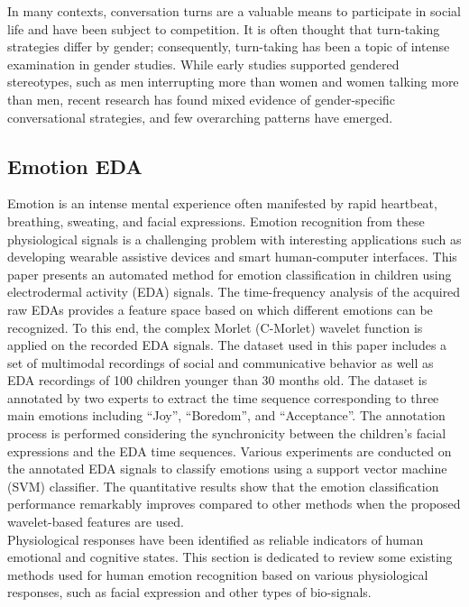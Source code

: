In many contexts, conversation turns are a valuable means to participate in social life 
and have been subject to competition.\cite{DOMER2011} It is often thought that turn-taking strategies 
differ by gender; consequently, turn-taking has been a topic of intense examination in 
gender studies. While early studies supported gendered stereotypes, such as men interrupting
more than women and women talking more than men,\cite{DefineSocial2005} recent research has found mixed evidence 
of gender-specific conversational strategies, and few overarching patterns have emerged.\cite{SocialInteract2003}\\



\subsection{Emotion EDA}
Emotion is an intense mental experience often manifested by rapid heartbeat, breathing, 
sweating, and facial expressions. Emotion recognition from these physiological signals 
is a challenging problem with interesting applications such as developing wearable 
assistive devices and smart human-computer interfaces. This paper presents an automated 
method for emotion classification in children using electrodermal activity (EDA) signals. 
The time-frequency analysis of the acquired raw EDAs provides a feature space based on 
which different emotions can be recognized. To this end, the complex Morlet (C-Morlet) 
wavelet function is applied on the recorded EDA signals. The dataset used in this paper 
includes a set of multimodal recordings of social and communicative behavior as well 
as EDA recordings of 100 children younger than 30 months old. The dataset is annotated 
by two experts to extract the time sequence corresponding to three main emotions 
including “Joy”, “Boredom”, and “Acceptance”. The annotation process is performed 
considering the synchronicity between the children's facial expressions and the EDA 
time sequences. Various experiments are conducted on the annotated EDA signals to 
classify emotions using a support vector machine (SVM) classifier. The quantitative 
results show that the emotion classification performance remarkably improves compared 
to other methods when the proposed wavelet-based features are used.\\


Physiological responses have been identified as reliable indicators of human emotional 
and cognitive states. This section is dedicated to review some existing methods used for 
human emotion recognition based on various physiological responses, such as facial 
expression and other types of bio-signals. \\
   
